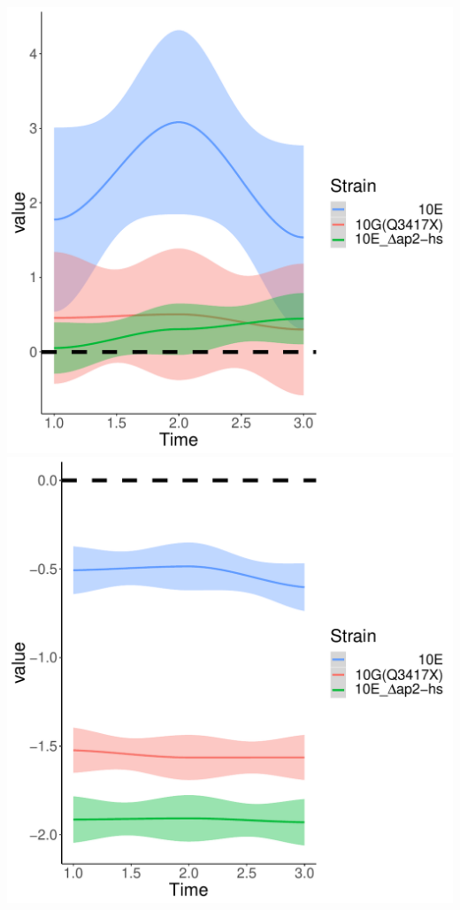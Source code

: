 \documentclass{article}\usepackage[]{graphicx}\usepackage[]{color}
\newenvironment{knitrout}{}{} %
\begin{document}
\begin{knitrout}
{\centering \includegraphics[width=1\linewidth]{figure/minimal-clust_exp-1} 
\includegraphics[width=1\linewidth]{figure/minimal-clust_exp-2} 
}
\end{knitrout}
\end{document}
